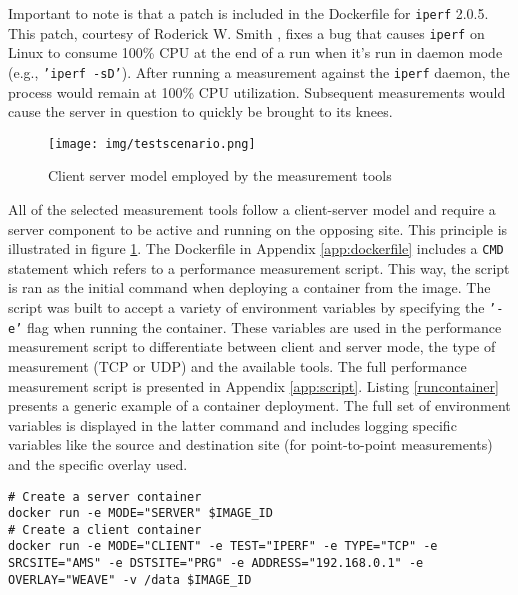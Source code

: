 Important to note is that a patch is included in the Dockerfile for \texttt{iperf} 2.0.5. This patch, courtesy of Roderick W. Smith \cite{smith_2014}, fixes a bug that causes \texttt{iperf} on Linux to consume 100\% CPU at the end of a run when it's run in daemon mode (e.g., \texttt{'iperf -sD'}). After running a measurement against the \texttt{iperf} daemon, the process would remain at 100\% CPU utilization. Subsequent measurements would cause the server in question to quickly be brought to its knees.

\begin{figure}[!ht]
   \centering
   \texttt{[image: img/testscenario.png]}
   \caption{Client server model employed by the measurement tools}
   \label{fig:cltsrvmodel}
\end{figure}

All of the selected measurement tools follow a client-server model and require a server component to be active and running on the opposing site. This principle is illustrated in figure \ref{fig:cltsrvmodel}. The Dockerfile in Appendix \ref{app:dockerfile} includes a \texttt{CMD} statement which refers to a performance measurement script. This way, the script is ran as the initial command when deploying a container from the image. The script was built to accept a variety of environment variables by specifying the \texttt{'-e'} flag when running the container. These variables are used in the performance measurement script to differentiate between client and server mode, the type of measurement (TCP or UDP) and the available tools. The full performance measurement script is presented in Appendix \ref{app:script}. Listing \ref{runcontainer} presents a generic example of a container deployment. The full set of environment variables is displayed in the latter command and includes logging specific variables like the source and destination site (for point-to-point measurements) and the specific overlay used. 
\\
\begin{lstlisting}[caption={Creating the server and client container},label=runcontainer]
# Create a server container
docker run -e MODE="SERVER" $IMAGE_ID
# Create a client container
docker run -e MODE="CLIENT" -e TEST="IPERF" -e TYPE="TCP" -e SRCSITE="AMS" -e DSTSITE="PRG" -e ADDRESS="192.168.0.1" -e OVERLAY="WEAVE" -v /data $IMAGE_ID
\end{lstlisting}

